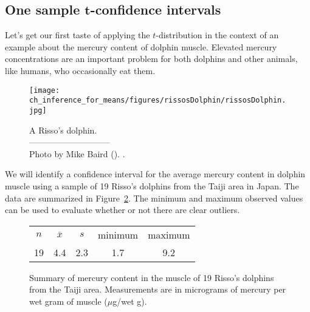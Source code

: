 \D{\newpage}

\subsection{One sample $\mathbf{t}$-confidence intervals}
\label{oneSampleTConfidenceIntervals}


Let's get our first taste of applying the $t$-distribution
in the context of an example about the mercury content
of dolphin muscle.
Elevated mercury concentrations are an important problem
for both dolphins
and other animals, like humans, who occasionally eat them.
\setlength{\captionwidth}{86mm}

\begin{figure}[h]
\centering
\texttt{[image: ch\_inference\_for\_means/figures/rissosDolphin/rissosDolphin.jpg]}  \\
\addvspace{2mm}
\begin{minipage}{\textwidth}
   \caption[rissosDolphinPic]{A Risso's dolphin.\vspace{-1mm} \\
   -----------------------------\vspace{-2mm}\\
   {\footnotesize Photo by Mike Baird (). .}\vspace{-8mm}}
   \label{rissosDolphin}
\end{minipage}
\stdvspace{}
\end{figure}
\setlength{\captionwidth}{\mycaptionwidth}

We will identify a confidence interval for the average mercury content in dolphin muscle using a sample of 19 Risso's dolphins from the Taiji area in Japan. The data are summarized in Figure~\ref{summaryStatsOfHgInMuscleOfRissosDolphins}. The minimum and maximum observed values can be used to evaluate whether or not there are clear outliers.

\begin{figure}[h]
\centering
\begin{tabular}{ccc cc}
\hline
$n$ & $\bar{x}$ & $s$ & minimum & maximum \\
19   & 4.4	  & 2.3  & 1.7	       & 9.2 \\
\hline
\end{tabular}
\caption{Summary of mercury content in the muscle of
    19 Risso's dolphins from the Taiji area.
    Measurements are in micrograms of mercury per wet gram
    of muscle ($\mu$g/wet g).}
\label{summaryStatsOfHgInMuscleOfRissosDolphins}
\end{figure}

